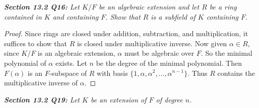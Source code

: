 \documentclass{article}
\begin{document}
\it \textbf{Section 13.2 Q16:} Let $K/F$ be an algebraic extension and let
  $R$ be a ring contained in $K$ and containing $F$. Show that $R$ is a
  subfield of $K$ containing $F$.

  \begin{proof}
    Since rings are closed under addition, subtraction, and multiplication,
    it suffices to show that $R$ is closed under multiplicative inverse.
    Now given $\alpha\in R$, since $K/F$ is an algebraic extension,
    $\alpha$ must be algebraic over $F$. So the minimal polynomial
    of $\alpha$ exists. Let $n$ be the degree of the minimal polynomial.
    Then $F(\alpha)$ is an $F$-subspace of $R$ with basis
    $\{1,\alpha,\alpha^2,\ldots,\alpha^{n-1}\}$. Thus $R$ contains the
    multiplicative inverse of $\alpha$.
  \end{proof}

\it \textbf{Section 13.2 Q19:} Let $K$ be an extension of $F$ of degree
  $n$.
\end{document}
